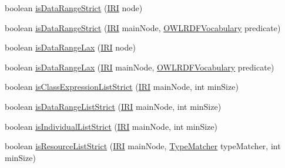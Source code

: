 \begin{DoxyCompactItemize}
\item 
boolean \hyperlink{classorg_1_1coode_1_1owlapi_1_1rdfxml_1_1parser_1_1_abstract_class_expression_translator_aa7bb1c6ad43a974cb321c4070d780bc4}{is\-Data\-Range\-Strict} (\hyperlink{classorg_1_1semanticweb_1_1owlapi_1_1model_1_1_i_r_i}{I\-R\-I} node)
\item 
boolean \hyperlink{classorg_1_1coode_1_1owlapi_1_1rdfxml_1_1parser_1_1_abstract_class_expression_translator_ad3401cb59b5030e6e4c994a08c6916b7}{is\-Data\-Range\-Strict} (\hyperlink{classorg_1_1semanticweb_1_1owlapi_1_1model_1_1_i_r_i}{I\-R\-I} main\-Node, \hyperlink{enumorg_1_1semanticweb_1_1owlapi_1_1vocab_1_1_o_w_l_r_d_f_vocabulary}{O\-W\-L\-R\-D\-F\-Vocabulary} predicate)
\item 
boolean \hyperlink{classorg_1_1coode_1_1owlapi_1_1rdfxml_1_1parser_1_1_abstract_class_expression_translator_ac4c5f03648e4c7ee1fab4acb1961b6ee}{is\-Data\-Range\-Lax} (\hyperlink{classorg_1_1semanticweb_1_1owlapi_1_1model_1_1_i_r_i}{I\-R\-I} node)
\item 
boolean \hyperlink{classorg_1_1coode_1_1owlapi_1_1rdfxml_1_1parser_1_1_abstract_class_expression_translator_ab4ef5577cbd2ac058f270fbd08298d32}{is\-Data\-Range\-Lax} (\hyperlink{classorg_1_1semanticweb_1_1owlapi_1_1model_1_1_i_r_i}{I\-R\-I} main\-Node, \hyperlink{enumorg_1_1semanticweb_1_1owlapi_1_1vocab_1_1_o_w_l_r_d_f_vocabulary}{O\-W\-L\-R\-D\-F\-Vocabulary} predicate)
\item 
boolean \hyperlink{classorg_1_1coode_1_1owlapi_1_1rdfxml_1_1parser_1_1_abstract_class_expression_translator_af42b3fc926aebec4298b247a12e8f62e}{is\-Class\-Expression\-List\-Strict} (\hyperlink{classorg_1_1semanticweb_1_1owlapi_1_1model_1_1_i_r_i}{I\-R\-I} main\-Node, int min\-Size)
\item 
boolean \hyperlink{classorg_1_1coode_1_1owlapi_1_1rdfxml_1_1parser_1_1_abstract_class_expression_translator_a2575a61338a9c95e3b4ddb22e82b5f3d}{is\-Data\-Range\-List\-Strict} (\hyperlink{classorg_1_1semanticweb_1_1owlapi_1_1model_1_1_i_r_i}{I\-R\-I} main\-Node, int min\-Size)
\item 
boolean \hyperlink{classorg_1_1coode_1_1owlapi_1_1rdfxml_1_1parser_1_1_abstract_class_expression_translator_ae20c1de07c5601e99dd8cf884597f7d4}{is\-Individual\-List\-Strict} (\hyperlink{classorg_1_1semanticweb_1_1owlapi_1_1model_1_1_i_r_i}{I\-R\-I} main\-Node, int min\-Size)
\item 
boolean \hyperlink{classorg_1_1coode_1_1owlapi_1_1rdfxml_1_1parser_1_1_abstract_class_expression_translator_abfe1371967ecedad6c5ee47d01599166}{is\-Resource\-List\-Strict} (\hyperlink{classorg_1_1semanticweb_1_1owlapi_1_1model_1_1_i_r_i}{I\-R\-I} main\-Node, \hyperlink{interfaceorg_1_1coode_1_1owlapi_1_1rdfxml_1_1parser_1_1_abstract_class_expression_translator_1_1_type_matcher}{Type\-Matcher} type\-Matcher, int min\-Size)
\end{DoxyCompactItemize}
